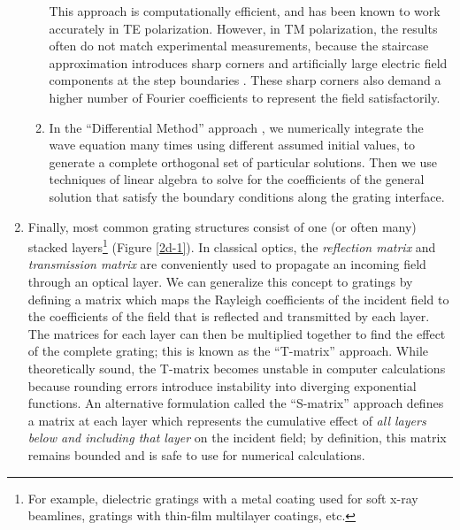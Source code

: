 \begin{enumerate}
\begin{enumerate}
	This approach is computationally efficient, and has been known to work accurately in TE polarization.  However, in TM polarization, the results often do not match experimental measurements, because the staircase approximation introduces sharp corners and artificially large electric field components at the step boundaries  \cite{Pop02}.  These sharp corners also demand a higher number of Fourier coefficients to represent the field satisfactorily.
	\item In the ``Differential Method'' approach \cite{Pop00}, we numerically integrate the wave equation many times using different assumed initial values, to generate a complete orthogonal set of particular solutions. Then we use techniques of linear algebra to solve for the coefficients of the general solution that satisfy the boundary conditions along the grating interface.
	\end{enumerate}
\item Finally, most common grating structures consist of one (or often many) stacked layers\footnote{For example, dielectric gratings with a metal coating used for soft x-ray beamlines, gratings with thin-film multilayer coatings, etc.} (Figure \ref{2d-1}).  In classical optics, the \emph{reflection matrix} and \emph{transmission matrix} are conveniently used to propagate an incoming field through an optical layer.  We can generalize this concept to gratings by defining a matrix which maps the Rayleigh coefficients of the incident field to the coefficients of the field that is reflected and transmitted by each layer.  The matrices for each layer can then be multiplied together to find the effect of the complete grating; this is known as the ``T-matrix'' approach.  While theoretically sound, the T-matrix becomes unstable in computer calculations because rounding errors introduce instability into diverging exponential functions.  An alternative formulation called the ``S-matrix'' approach defines a matrix at each layer which represents the cumulative effect of \emph{all layers below and including that layer} on the incident field; by definition, this matrix remains bounded and is safe to use for numerical calculations. \cite{Li96}
\end{enumerate}

